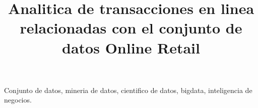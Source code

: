 \documentclass[conference]{IEEEtran}\usepackage[]{graphicx}\usepackage[]{color}
\begin{document}
\title{Analitica de transacciones en linea relacionadas con el conjunto de datos 
Online Retail}


\author{
}

\maketitle

 

\begin{IEEEkeywords}
	Conjunto de datos, mineria de datos, cientifico de datos, bigdata, inteligencia de negocios.
\end{IEEEkeywords}







\end{document}
